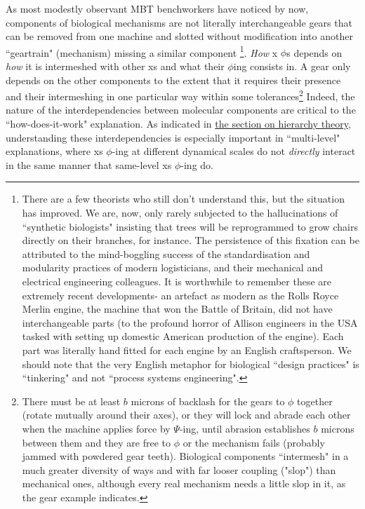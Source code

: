 \begin{enumerate}
As most modestly observant MBT benchworkers have noticed by now, components of biological mechanisms are not literally interchangeable gears that can be removed from one machine and slotted without modification into another ``geartrain" (mechanism) missing a similar component \footnote{There are a few theorists who still don't understand this, but the situation has improved. We are, now, only rarely subjected to the hallucinations of ``synthetic biologists" insisting that trees will be reprogrammed to grow chairs directly on their branches, for instance. The persistence of this fixation can be attributed to the mind-boggling success of the standardisation and modularity practices of modern logisticians, and their mechanical and electrical engineering colleagues. It is worthwhile to remember these are extremely recent developments- an artefact as modern as the Rolls Royce Merlin engine, the machine that won the Battle of Britain, did not have interchangeable parts (to the profound horror of Allison engineers in the USA tasked with setting up domestic American production of the engine). Each part was literally hand fitted for each engine by an English craftsperson. We should note that the very English metaphor for biological ``design practices" is ``tinkering" and not ``process systems engineering".}. \textit{How} x $\phi$s depends on \textit{how} it is intermeshed with other xs and what their $\phi$ing consists in. A gear only depends on the other components to the extent that it requires their presence and their intermeshing in one particular way within some tolerances\footnote{There must be at least $b$ microns of backlash for the gears to $\phi$ together (rotate mutually around their axes), or they will lock and abrade each other when the machine applies force by $\Psi$-ing, until abrasion establishes $b$ microns between them and they are free to $\phi$ or the mechanism fails (probably jammed with powdered gear teeth). Biological components ``intermesh" in a much greater diversity of ways and with far looser coupling ("slop") than mechanical ones, although every real mechanism needs a little slop in it, as the gear example indicates.} Indeed, the nature of the interdependencies between molecular components are critical to the ``how-does-it-work" explanation. As indicated in \hyperref[hierarchy]{the section on hierarchy theory}, understanding these interdependencies is especially important in ``multi-level" explanations, where xs $\phi$-ing at different dynamical scales do not \textit{directly} interact in the same manner that same-level xs $\phi$-ing do.

\end{enumerate}

